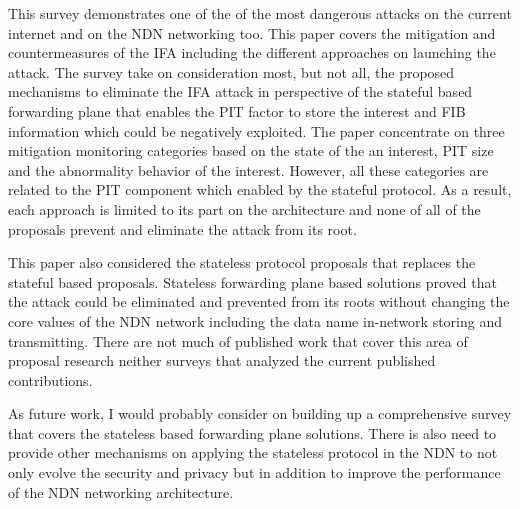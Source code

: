 \documentclass[conference]{IEEEtran}
\begin{document}
This survey demonstrates one of the of the most dangerous attacks on the current internet and on the NDN networking too. This paper covers the mitigation and countermeasures of the IFA including the different approaches on launching the attack. The survey take on consideration most, but not all, the proposed mechanisms to eliminate the IFA attack in perspective of the stateful based forwarding plane that enables the PIT factor to store the interest and FIB information which could be negatively exploited. The paper concentrate on three mitigation monitoring categories based on the state of the an interest, PIT size and the abnormality behavior of the interest. However, all these categories are related to the PIT component which enabled by the stateful protocol. As a result, each approach is limited to its part on the architecture and none of all of the proposals prevent and eliminate the attack from its root. 

This paper also considered the stateless protocol proposals that replaces the stateful based proposals. Stateless forwarding plane based solutions proved that the attack could be eliminated and prevented from its roots without changing the core values of the NDN network including the data name in-network storing and transmitting. There are not much of published work that cover this area of proposal research neither surveys that analyzed the current published contributions.

As future work, I would probably consider on building up a comprehensive survey that covers the stateless based forwarding plane solutions. There is also need to provide other mechanisms on applying the stateless protocol in the NDN to not only evolve the security and privacy but in addition to improve the performance of the NDN networking architecture.   


     





\end{document}
